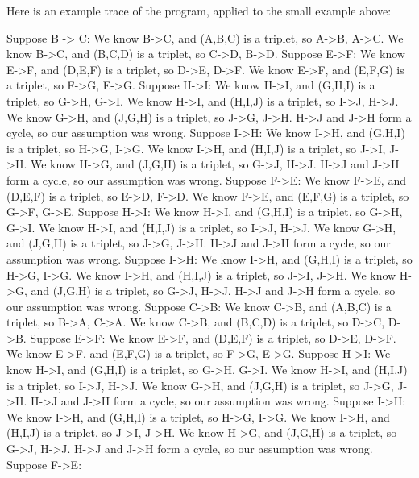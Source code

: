 \documentclass[12pt]{article}
\begin{document}
    Here is an example trace of the program, applied to the small example above:
    \begin{verbatimtab}
Suppose B -> C:
    We know B->C, and (A,B,C) is a triplet, so A->B, A->C.
    We know B->C, and (B,C,D) is a triplet, so C->D, B->D.
    Suppose E->F:
        We know E->F, and (D,E,F) is a triplet, so D->E, D->F.
        We know E->F, and (E,F,G) is a triplet, so F->G, E->G.
        Suppose H->I:
            We know H->I, and (G,H,I) is a triplet, so G->H, G->I.
            We know H->I, and (H,I,J) is a triplet, so I->J, H->J.
            We know G->H, and (J,G,H) is a triplet, so J->G, J->H.
            H->J and J->H form a cycle, so our assumption was wrong.
        Suppose I->H:
            We know I->H, and (G,H,I) is a triplet, so H->G, I->G.
            We know I->H, and (H,I,J) is a triplet, so J->I, J->H.
            We know H->G, and (J,G,H) is a triplet, so G->J, H->J.
            H->J and J->H form a cycle, so our assumption was wrong.
    Suppose F->E:
        We know F->E, and (D,E,F) is a triplet, so E->D, F->D.
        We know F->E, and (E,F,G) is a triplet, so G->F, G->E.
        Suppose H->I:
            We know H->I, and (G,H,I) is a triplet, so G->H, G->I.
            We know H->I, and (H,I,J) is a triplet, so I->J, H->J.
            We know G->H, and (J,G,H) is a triplet, so J->G, J->H.
            H->J and J->H form a cycle, so our assumption was wrong.
        Suppose I->H:
            We know I->H, and (G,H,I) is a triplet, so H->G, I->G.
            We know I->H, and (H,I,J) is a triplet, so J->I, J->H.
            We know H->G, and (J,G,H) is a triplet, so G->J, H->J.
            H->J and J->H form a cycle, so our assumption was wrong.
Suppose C->B:
    We know C->B, and (A,B,C) is a triplet, so B->A, C->A.
    We know C->B, and (B,C,D) is a triplet, so D->C, D->B.
    Suppose E->F:
        We know E->F, and (D,E,F) is a triplet, so D->E, D->F.
        We know E->F, and (E,F,G) is a triplet, so F->G, E->G.
        Suppose H->I:
            We know H->I, and (G,H,I) is a triplet, so G->H, G->I.
            We know H->I, and (H,I,J) is a triplet, so I->J, H->J.
            We know G->H, and (J,G,H) is a triplet, so J->G, J->H.
            H->J and J->H form a cycle, so our assumption was wrong.
        Suppose I->H:
            We know I->H, and (G,H,I) is a triplet, so H->G, I->G.
            We know I->H, and (H,I,J) is a triplet, so J->I, J->H.
            We know H->G, and (J,G,H) is a triplet, so G->J, H->J.
            H->J and J->H form a cycle, so our assumption was wrong.
    Suppose F->E:

\end{verbatimtab}
\end{document}
